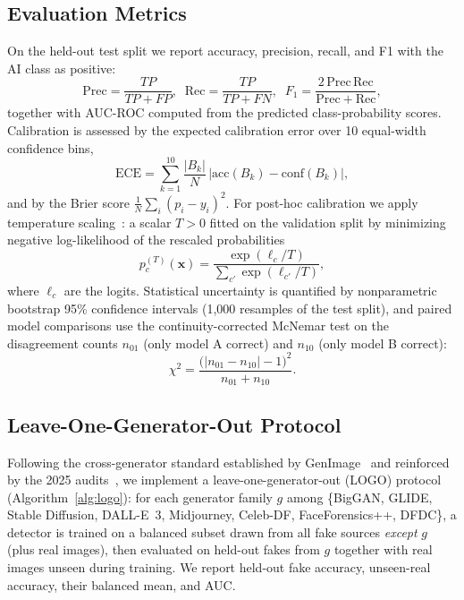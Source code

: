 \documentclass[journal]{IEEEtran}
\begin{document}
\subsection{Evaluation Metrics}
\label{sec:metrics}
On the held-out test split we report accuracy, precision, recall, and F1 with the AI class as positive:
\begin{equation}
\mathrm{Prec} = \frac{TP}{TP+FP},\;\;
\mathrm{Rec} = \frac{TP}{TP+FN},\;\;
F_1 = \frac{2\,\mathrm{Prec}\,\mathrm{Rec}}{\mathrm{Prec} + \mathrm{Rec}},
\label{eq:prf}
\end{equation}
together with AUC-ROC computed from the predicted class-probability scores. Calibration is assessed by the expected calibration error over 10 equal-width confidence bins,
\begin{equation}
\mathrm{ECE} = \sum_{k=1}^{10} \frac{|B_k|}{N}\, \big| \mathrm{acc}(B_k) - \mathrm{conf}(B_k) \big|,
\label{eq:ece}
\end{equation}
and by the Brier score $\frac{1}{N}\sum_i (p_i - y_i)^2$. For post-hoc calibration we apply temperature scaling~\cite{guo2017}: a scalar $T > 0$ fitted on the validation split by minimizing negative log-likelihood of the rescaled probabilities
\begin{equation}
p_c^{(T)}(\mathbf{x}) = \frac{\exp(\ell_c / T)}{\sum_{c'} \exp(\ell_{c'} / T)},
\label{eq:temp}
\end{equation}
where $\ell_c$ are the logits. Statistical uncertainty is quantified by nonparametric bootstrap 95\% confidence intervals (1{,}000 resamples of the test split), and paired model comparisons use the continuity-corrected McNemar test on the disagreement counts $n_{01}$ (only model A correct) and $n_{10}$ (only model B correct):
\begin{equation}
\chi^2 = \frac{\big(|n_{01} - n_{10}| - 1\big)^2}{n_{01} + n_{10}}.
\label{eq:mcnemar}
\end{equation}

\subsection{Leave-One-Generator-Out Protocol}
\label{sec:logoprotocol}
Following the cross-generator standard established by GenImage~\cite{zhu2023genimage} and reinforced by the 2025 audits~\cite{yan2025sanity,li2025aigibench}, we implement a leave-one-generator-out (LOGO) protocol (Algorithm~\ref{alg:logo}): for each generator family $g$ among \{BigGAN, GLIDE, Stable Diffusion, DALL-E~3, Midjourney, Celeb-DF, FaceForensics++, DFDC\}, a detector is trained on a balanced subset drawn from all fake sources \emph{except} $g$ (plus real images), then evaluated on held-out fakes from $g$ together with real images unseen during training. We report held-out fake accuracy, unseen-real accuracy, their balanced mean, and AUC.
\end{document}
